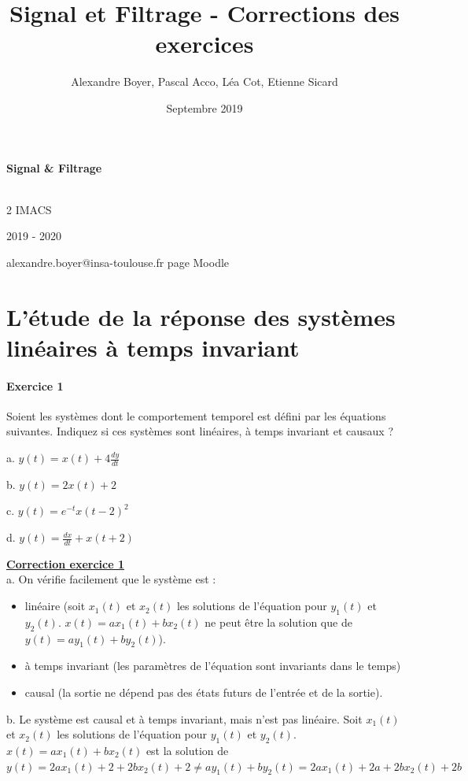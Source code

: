 \documentclass[11pt]{report}
\title{{\huge Signal et Filtrage - Corrections des exercices}}
\author{Alexandre Boyer, Pascal Acco, Léa Cot, Etienne Sicard}
\date{Septembre 2019}
\begin{document}
	\maketitle
	
	\textbf{Signal \& Filtrage}
	
	\textbf{}\\
	
	2 IMACS
	
	2019 - 2020
	
	alexandre.boyer@insa-toulouse.fr	
	page Moodle
	
	
\chapter{L'étude de la réponse des systèmes linéaires à temps invariant}

	\subsubsection{Exercice 1} 
	Soient les systèmes dont le comportement temporel est défini par les équations suivantes. Indiquez si ces systèmes sont linéaires, à temps invariant et causaux ?
	
	a. $y(t) = x(t)+4\frac{dy}{dt}$ 
	
	b. $y(t) = 2x(t)+2$ 
	
	c. $y(t)=e^{-t}x(t-2)^{2}$
	
	d. $y(t)=\frac{dx}{dt}+x(t+2)$
	
	\vspace{1\baselineskip}
	

	
	\textbf{\underline{Correction exercice 1}}\\
	a. On vérifie facilement que le système est :
	 \begin{itemize}
	 	\item linéaire (soit $x_{1}(t) $ et $x_{2}(t)$ les solutions de l'équation pour $y_{1}(t)$ et $y_{2}(t)$. $x(t)=ax_{1}(t)+bx_{2}(t)$ ne peut être la solution que de $y(t)=ay_{1}(t)+by_{2}(t)$).
	 	\item à temps invariant (les paramètres de l'équation sont invariants dans le temps)
	 	\item causal (la sortie ne dépend pas des états futurs de l'entrée et de la sortie).
	 \end{itemize}
 	\vspace{0.5\baselineskip}
 	b. Le système est causal et à temps invariant, mais n'est pas linéaire. Soit  $x_{1}(t) $ et $x_{2}(t)$ les solutions de l'équation pour $y_{1}(t)$ et $y_{2}(t)$. $x(t)= ax_{1}(t)+bx_{2}(t)$ est la solution de $y(t)=2ax_{1}(t)+2+2bx_{2}(t)+2 \neq ay_{1}(t)+by_{2}(t)=2ax_{1}(t)+2a+2bx_{2}(t)+2b$
 	
\end{document}

